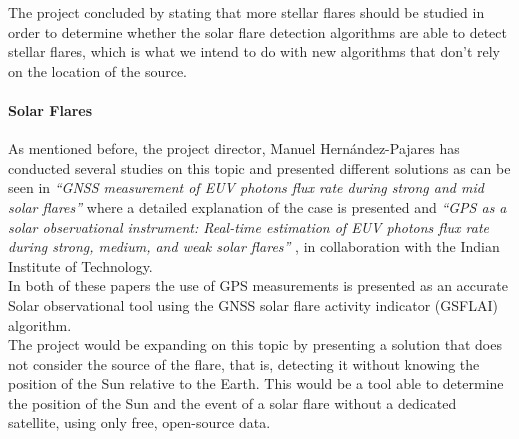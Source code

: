 \documentclass[12pt]{article}
\begin{document}
The project concluded by stating that more stellar flares should be studied in order to determine whether the solar flare detection algorithms are able to detect stellar flares, which is what we intend to do with new algorithms that don’t rely on the location of the source.

\paragraph{Solar Flares}

As mentioned before, the project director, Manuel Hernández-Pajares has conducted several studies on this topic and presented different solutions as can be seen in \textit{“GNSS measurement of EUV photons flux rate during strong and mid solar flares”} \cite{hernandez2012gnss} where a detailed explanation of the case is presented and \textit{“GPS as a solar observational instrument: Real-time estimation of EUV photons flux rate during strong, medium, and weak solar flares”} \cite{singh2015gps}, in collaboration with the Indian Institute of Technology.\\

In both of these papers the use of GPS measurements is presented as an accurate Solar observational tool using the GNSS solar flare activity indicator (GSFLAI) algorithm.\\

The project would be expanding on this topic by presenting a solution that does not consider the source of the flare, that is, detecting it without knowing the position of the Sun relative to the Earth. This would be a tool able to determine the position of the Sun and the event of a solar flare without a dedicated satellite, using only free, open-source data.


\newpage


\end{document}
